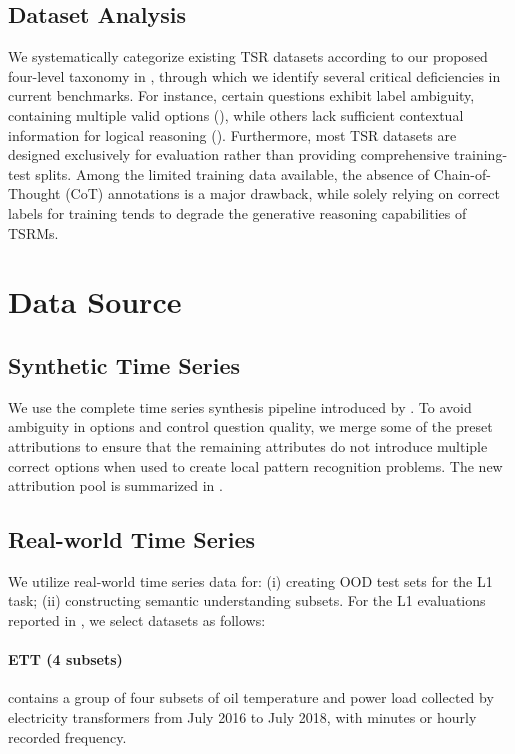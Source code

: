\documentclass[11pt]{article}
\begin{document}
\subsection{Dataset Analysis}\label{sec:task_sum}
We systematically categorize existing TSR datasets according to our proposed four-level taxonomy in , through which we identify several critical deficiencies in current benchmarks. For instance, certain questions exhibit label ambiguity, containing multiple valid options (), while others lack sufficient contextual information for logical reasoning (). Furthermore, most TSR datasets are designed exclusively for evaluation rather than providing comprehensive training-test splits. Among the limited training data available, the absence of Chain-of-Thought (CoT) annotations is a major drawback, while solely relying on correct labels for training tends to degrade the generative reasoning capabilities of TSRMs.

\section{Data Source}\label{sec:data_source}

\subsection{Synthetic Time Series}
We use the complete time series synthesis pipeline introduced by \cite{chatts}. To avoid ambiguity in options and control question quality, we merge some of the preset attributions to ensure that the remaining attributes do not introduce multiple correct options when used to create local pattern recognition problems. The new attribution pool is summarized in .

\subsection{Real-world Time Series}
We utilize real-world time series data for: (i) creating OOD test sets for the L1 task; (ii) constructing semantic understanding subsets.
For the L1 evaluations reported in , we select datasets as follows:
\paragraph{ETT (4 subsets)} \cite{informer} contains a group of four subsets of oil temperature and power load collected by electricity transformers from July 2016 to July 2018, with minutes or hourly recorded frequency.
\end{document}
